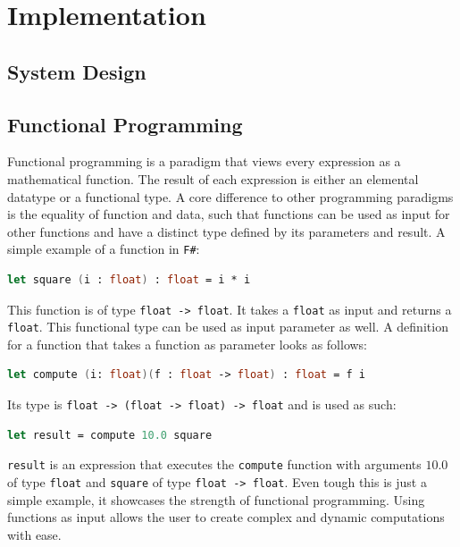 \chapter{Implementation}


\section{System Design}
\subsection{}

\section{Functional Programming}

Functional programming is a paradigm that views every expression as a mathematical function. The result of each expression is either an elemental datatype or a functional type. A core difference to other programming paradigms is the equality of function and data, such that functions can be used as input for other functions and have a distinct type defined by its parameters and result. A simple example of a function in \verb|F#|: 

\begin{lstlisting}[language=FSharp]
let square (i : float) : float = i * i 
\end{lstlisting}

This function is of type \verb|float -> float|. It takes a \verb|float| as input and returns a \verb|float|. This functional type can be used as input parameter as well. A definition for a function that takes a function as parameter looks as follows: 

\begin{lstlisting}[language=FSharp]
let compute (i: float)(f : float -> float) : float = f i
\end{lstlisting}
Its type is \verb|float -> (float -> float) -> float| and is used as such: 
\begin{lstlisting}[language=FSharp]
let result = compute 10.0 square
\end{lstlisting}

\verb|result| is an expression that executes the \verb|compute| function with arguments $10.0$ of type \verb|float| and \verb|square| of type \verb|float -> float|. Even tough this is just a simple example, it showcases the strength of functional programming.  Using functions as input allows the user to create complex and dynamic computations with ease. 
\\

